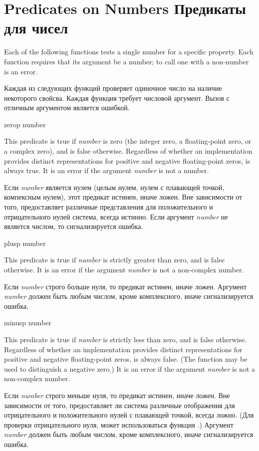 \section{Predicates on Numbers Предикаты для чисел}

Each of the following functions tests a single number for
a specific property.
Each function requires that its argument be
a number; to call one with a non-number is an error.

Каждая из следующих функций проверяет одиночное число на наличие некоторого
свойсва.
Каждая функция требует числовой аргумент. Вызов с отличным аргументом является
ошибкой.

\begin{defun}[Function]
zerop number

This predicate is true if \emph{number} is zero (the integer zero,
a floating-point zero, or a complex zero), and is false otherwise.
Regardless of whether an implementation provides distinct representations
for positive and negative floating-point zeros,
 is always true.
It is an error if the argument \emph{number} is not a number.

Если \emph{number} является нулем (целым нулем, нулем с
плавающей точкой, компексным нулем), этот предикат истинен, иначе ложен.
Вне зависимости от того, предоставляет различные представления для
положительного и отрицательного нулей система,  всегда истинно.
Если аргумент \emph{number} не является числом, то сигнализируется ошибка.
\end{defun}

\begin{defun}[Function]
plusp number

This predicate is true if \emph{number} is strictly greater than zero,
and is false otherwise.
It is an error if the argument \emph{number} is not a non-complex number.

Если \emph{number} строго больше нуля, то предикат истинен, иначе ложен.
Аргумент \emph{number} должен быть любым числом, кроме комплексного, иначе
сигнализируется ошибка. 
\end{defun}

\begin{defun}[Function]
minusp number

This predicate is true if \emph{number} is strictly less than zero,
and is false otherwise.
Regardless of whether an implementation provides distinct representations
for positive and negative floating-point zeros,
 is always false.
(The function  may be used to distinguish a negative zero.)
It is an error if the argument \emph{number} is not a non-complex number.

Если \emph{number} строго меньше нуля, то предикат истинен, иначе ложен.
Вне зависимости от того, предоставляет ли система различные отображения для
отрицательного и положительного нулей с плавающей точкой, 
всегда ложно.
(Для проверки отрицательного нуля, может использоваться функция
.)
Аргумент \emph{number} должен быть любым числом, кроме комплексного, иначе
сигнализируется ошибка. 
\end{defun}

